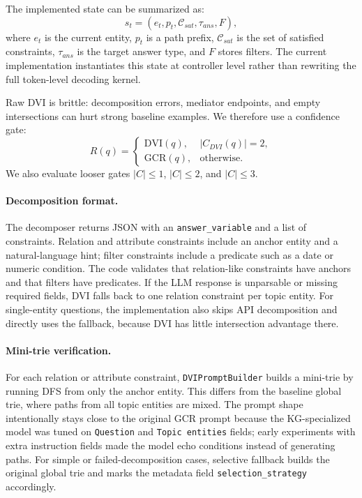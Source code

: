 \documentclass[10pt,twocolumn]{article}
\newcommand{\code}[1]{\texttt{#1}}
\begin{document}
The implemented state can be summarized as:
\begin{equation}
s_t=(e_t,p_t,\mathcal{C}_{sat},\tau_{ans},F),
\end{equation}
where $e_t$ is the current entity, $p_t$ is a path prefix, $\mathcal{C}_{sat}$ is the set of satisfied constraints, $\tau_{ans}$ is the target answer type, and $F$ stores filters. The current implementation instantiates this state at controller level rather than rewriting the full token-level decoding kernel.

Raw DVI is brittle: decomposition errors, mediator endpoints, and empty intersections can hurt strong baseline examples. We therefore use a confidence gate:
\begin{equation}
R(q)=
\begin{cases}
\mathrm{DVI}(q), & |C_{DVI}(q)|=2,\\
\mathrm{GCR}(q), & \mathrm{otherwise}.
\end{cases}
\end{equation}
We also evaluate looser gates $|C|\le1$, $|C|\le2$, and $|C|\le3$.

\paragraph{Decomposition format.}
The decomposer returns JSON with an \code{answer\_variable} and a list of constraints. Relation and attribute constraints include an anchor entity and a natural-language hint; filter constraints include a predicate such as a date or numeric condition. The code validates that relation-like constraints have anchors and that filters have predicates. If the LLM response is unparsable or missing required fields, DVI falls back to one relation constraint per topic entity. For single-entity questions, the implementation also skips API decomposition and directly uses the fallback, because DVI has little intersection advantage there.

\paragraph{Mini-trie verification.}
For each relation or attribute constraint, \code{DVIPromptBuilder} builds a mini-trie by running DFS from only the anchor entity. This differs from the baseline global trie, where paths from all topic entities are mixed. The prompt shape intentionally stays close to the original GCR prompt because the KG-specialized model was tuned on \code{Question} and \code{Topic entities} fields; early experiments with extra instruction fields made the model echo conditions instead of generating paths. For simple or failed-decomposition cases, selective fallback builds the original global trie and marks the metadata field \code{selection\_strategy} accordingly.
\end{document}
